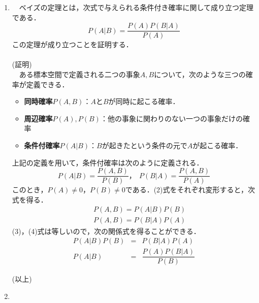 \documentclass[a4paper,11pt]{jarticle}
\begin{document}
\begin{enumerate}
 \item 
\ \ ベイズの定理とは，次式で与えられる条件付き確率に関して成り立つ定理である．
\begin{equation}
 P(A|B) = \dfrac{P(A)P(B|A)}{P(A)}
\end{equation}
この定理が成り立つことを証明する．\\\\
(証明)\\
\ \ ある標本空間で定義される二つの事象$ A,B $について，次のような三つの確率が定義できる．
\begin{itemize}
 \item {\bf 同時確率}$ P(A,B) $：$ AとB $が同時に起こる確率．
 \item {\bf 周辺確率}$ P(A),P(B) $：他の事象に関わりのない一つの事象だけの確率
 \item {\bf 条件付確率}$ P(A|B) $：$B$が起きたという条件の元で$A$が起こる確率．
\end{itemize}
上記の定義を用いて，条件付確率は次のように定義される．
\begin{equation}
 P(A|B) = \dfrac{P(A,B)}{P(B)}，~~ P(B|A) = \dfrac{P(A,B)}{P(A)}
\end{equation}
このとき，$ P(A) \neq 0 $，$ P(B) \neq 0 $である．(2)式をそれぞれ変形すると，次式を得る．
\begin{eqnarray}
 && P(A,B) = P(A|B)P(B) \\
 && P(A,B) = P(B|A)P(A)
\end{eqnarray}
(3)，(4)式は等しいので，次の関係式を得ることができる．
\begin{eqnarray}
 P(A|B)P(B) & = & P(B|A)P(A) \nonumber \\
 P(A|B) & = & \dfrac{P(A)P(B|A)}{P(B)}
\end{eqnarray}
\begin{flushright}
 (以上)
\end{flushright}
 \item

\end{enumerate}
\end{document}
